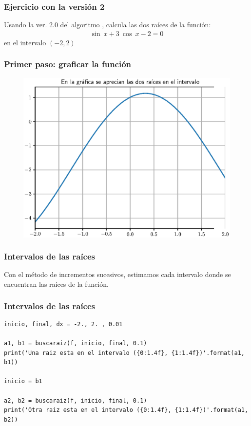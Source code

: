 \documentclass[12pt]{beamer}
\begin{document}
\begin{frame}
\frametitle{Ejercicio con la versión 2}
Usando la ver. 2.0 del algoritmo , calcula las dos raíces de la función:
\begin{align*}
\sin \: x + 3 \: \cos \: x - 2 = 0
\end{align*}
en el intervalo $(-2, 2)$
\end{frame}
\begin{frame}
\frametitle{Primer paso: graficar la función}
\begin{figure}
	\centering
    \includegraphics[scale=0.55]{Imagenes/raices_03_MNR_03.eps}
\end{figure}
\end{frame}
\begin{frame}[fragile]
\frametitle{Intervalos de las raíces}
Con el método de incrementos sucesivos, estimamos cada intervalo donde se encuentran las raíces de la función.
\end{frame}
\begin{frame}
\frametitle{Intervalos de las raíces}
\begin{lstlisting}[caption=Intervalos para las raíces]
inicio, final, dx = -2., 2. , 0.01

a1, b1 = buscaraiz(f, inicio, final, 0.1)
print('Una raiz esta en el intervalo ({0:1.4f}, {1:1.4f})'.format(a1, b1))

inicio = b1

a2, b2 = buscaraiz(f, inicio, final, 0.1)
print('Otra raiz esta en el intervalo ({0:1.4f}, {1:1.4f})'.format(a1, b2))
\end{lstlisting}
\end{frame}
\end{document}
